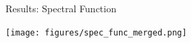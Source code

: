 \documentclass[aspectratio=169]{beamer}
\begin{document}
\begin{frame}{Results: Spectral Function}
	\begin{center}
		\texttt{[image: figures/spec\_func\_merged.png]}
	\end{center}
\end{frame}
\end{document}
